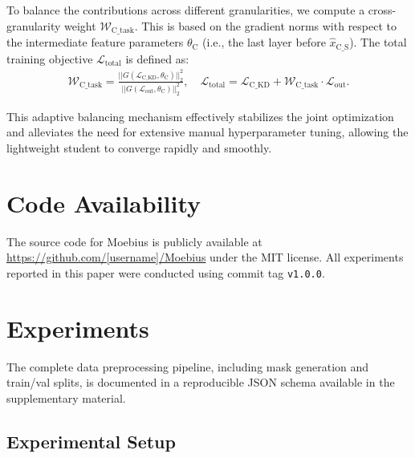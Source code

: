 \documentclass[runningheads]{llncs}
\begin{document}
To balance the contributions across different granularities, we compute a cross-granularity weight $\mathcal{W}_{\text{C\_task}}$. This is based on the gradient norms with respect to the intermediate feature parameters $\theta_\text{C}$ (i.e., the last layer before $\hat{x}_{\text{C\_S}}$). The total training objective $\mathcal{L}_{\text{total}}$ is defined as: 
\begin{equation}
\begin{gathered}
    \mathcal{W}_{\text{C\_task}} = \frac{||G(\mathcal{L}_{\text{C\_KD}}, \theta_\text{C})||^2_2}{||G(\mathcal{L}_{\text{out}}, \theta_\text{C})||^2_2}, \quad
    \mathcal{L}_{\text{total}} = \mathcal{L}_{\text{C\_KD}} + \mathcal{W}_{\text{C\_task}} \cdot \mathcal{L}_{\text{out}}.
\end{gathered}
\end{equation}

This adaptive balancing mechanism effectively stabilizes the joint optimization and alleviates the need for extensive manual hyperparameter tuning, allowing the lightweight student to converge rapidly and smoothly.


\vspace{-0.5em}
\section{Code Availability}
The source code for Moebius is publicly available at \url{https://github.com/[username]/Moebius} under the MIT license. All experiments reported in this paper were conducted using commit tag \texttt{v1.0.0}.

\section{Experiments}

The complete data preprocessing pipeline, including mask generation and train/val splits, is documented in a reproducible JSON schema available in the supplementary material.\label{sec:experiments}
\vspace{-0.5em}

\subsection{Experimental Setup}\label{subsec:setup}

\vspace{-0.4em}
\end{document}
